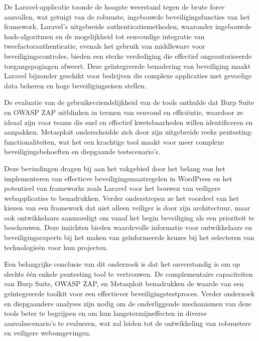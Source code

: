 De Laravel-applicatie toonde de hoogste weerstand tegen de brute force aanvallen, wat getuigt van de robuuste, 
ingebouwde beveiligingsfuncties van het framework. Laravel's uitgebreide authenticatiemethoden, waaronder ingebouwde 
hash-algoritmen en de mogelijkheid tot eenvoudige integratie van tweefactorauthenticatie, evenals het gebruik van 
middleware voor beveiligingscontroles, bieden een sterke verdediging die effectief ongeautoriseerde toegangspogingen 
afweert. Deze geïntegreerde benadering van beveiliging maakt Laravel bijzonder geschikt voor bedrijven die complexe 
applicaties met gevoelige data beheren en hoge beveiligingseisen stellen.

De evaluatie van de gebruiksvriendelijkheid van de tools onthulde dat Burp Suite en OWASP ZAP uitblinken in termen 
van eenvoud en efficiëntie, waardoor ze ideaal zijn voor teams die snel en effectief kwetsbaarheden willen identificeren 
en aanpakken. Metasploit onderscheidde zich door zijn uitgebreide reeks pentesting-functionaliteiten, wat het een 
krachtige tool maakt voor meer complexe beveiligingsbehoeften en diepgaande testscenario's.

Deze bevindingen dragen bij aan het vakgebied door het belang van het implementeren van effectieve beveiligingsmaatregelen 
in WordPress en het potentieel van frameworks zoals Laravel voor het bouwen van veiligere webapplicaties te benadrukken.
 Verder onderstrepen ze het voordeel van het kiezen van een framework dat niet alleen veiliger is door zijn architectuur,
  maar ook ontwikkelaars aanmoedigt om vanaf het begin beveiliging als een prioriteit te beschouwen. Deze inzichten bieden 
  waardevolle informatie voor ontwikkelaars en beveiligingsexperts bij het maken van geïnformeerde keuzes bij het 
  selecteren van technologieën voor hun projecten.

Een belangrijke conclusie van dit onderzoek is dat het onverstandig is om op slechts één enkele pentesting tool te 
vertrouwen. De complementaire capaciteiten van Burp Suite, OWASP ZAP, en Metasploit benadrukken de waarde van een 
geïntegreerde toolkit voor een effectiever beveiligingstestproces. Verder onderzoek en diepgaandere analyses zijn 
nodig om de onderliggende mechanismen van deze tools beter te begrijpen en om hun langetermijneffecten in diverse 
aanvalsscenario's te evalueren, wat zal leiden tot de ontwikkeling van robuustere en veiligere webomgevingen.